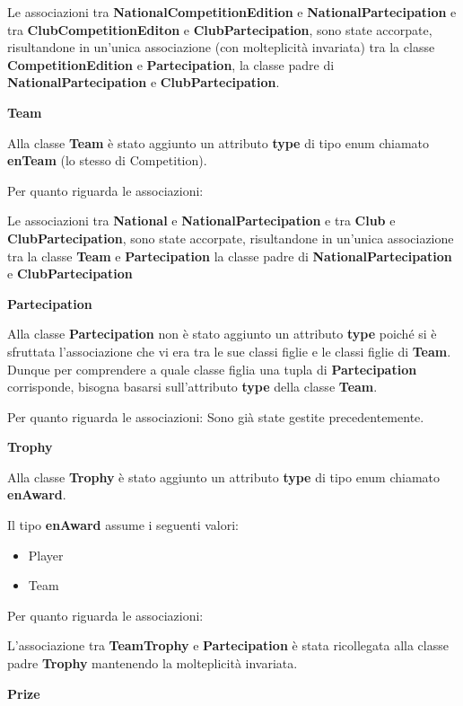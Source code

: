 Le associazioni tra \textbf{NationalCompetitionEdition} e 
\textbf{NationalPartecipation} e tra 
\textbf{ClubCompetitionEditon} e \textbf{ClubPartecipation}, 
sono state accorpate, risultandone in un'unica associazione 
(con molteplicità invariata) tra la classe 
\textbf{CompetitionEdition} e \textbf{Partecipation}, la 
classe padre di \textbf{NationalPartecipation} e 
\textbf{ClubPartecipation}.


\bigskip
\textbf{Team}
\bigskip

Alla classe \textbf{Team} è stato aggiunto un attributo 
\textbf{type} di tipo enum chiamato \textbf{enTeam} (lo 
stesso di Competition).

Per quanto riguarda le associazioni:

Le associazioni tra \textbf{National} e 
\textbf{NationalPartecipation} e tra \textbf{Club} e 
\textbf{ClubPartecipation}, sono state accorpate, 
risultandone in un'unica associazione tra la classe 
\textbf{Team} e \textbf{Partecipation} la classe padre di
\textbf{NationalPartecipation} e \textbf{ClubPartecipation}


\newpage

\textbf{Partecipation}
\bigskip

Alla classe \textbf{Partecipation} non è stato aggiunto un 
attributo \textbf{type} poiché si è sfruttata l'associazione 
che vi era tra le sue classi figlie e le classi figlie di 
\textbf{Team}. Dunque per comprendere a quale classe figlia 
una tupla di \textbf{Partecipation} corrisponde, bisogna 
basarsi sull'attributo \textbf{type} della classe 
\textbf{Team}.

Per quanto riguarda le associazioni:
Sono già state gestite precedentemente.

\bigskip
\textbf{Trophy}
\bigskip

Alla classe \textbf{Trophy} è stato aggiunto un attributo 
\textbf{type} di tipo enum chiamato \textbf{enAward}.

Il tipo \textbf{enAward} assume i seguenti valori:
\begin{itemize}
	\item Player
	\item Team
\end{itemize}


Per quanto riguarda le associazioni:

L'associazione tra \textbf{TeamTrophy} e 
\textbf{Partecipation} è stata ricollegata alla classe padre 
\textbf{Trophy} mantenendo la molteplicità invariata.


\bigskip
\textbf{Prize}
\bigskip

